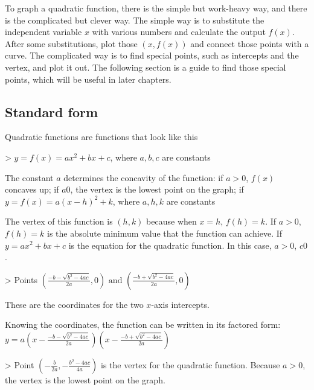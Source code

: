 To graph a quadratic function, there is the simple but work-heavy way, and there is the
complicated but clever way. The simple way is to substitute the independent variable $x$
with various numbers and calculate the output $f(x)$. After some substitutions, plot those
$(x,f(x))$ and connect those points with a curve. The complicated way is to find special
points, such as intercepts and the vertex, and plot it out. The following section is a
guide to find those special points, which will be useful in later chapters.




\subsection{Standard form}
\label{sss:stan-990f}




Quadratic functions are functions that look like this



> $y=f(x)=ax^2+bx+c$, where $a,b,c$ are constants



The constant $a$ determines the concavity of the function: if $a>0$, $f(x)$ concaves up;
if $a0$, the vertex is the lowest point on the graph; if $y=f(x)=a(x-h)^2+k$, where
$a,h,k$ are constants



The vertex of this function is $(h,k)$ because when $x=h$, $f(h)=k$. If $a>0$, $f(h)=k$ is
the absolute minimum value that the function can achieve. If $y=ax^2+bx+c$ is the
equation for the quadratic function. In this case, $a>0$, $c0$.



> Points $(\frac{-b-\sqrt{b^2-4ac}}{2a},0)\text{ and }(\frac{-b+\sqrt{b^2-4ac}}{2a},0)$



These are the coordinates for the two $x$-axis intercepts.



Knowing the coordinates, the function can be written in its factored form:
$y=a(x-\frac{-b-\sqrt{b^2-4ac}}{2a})(x-\frac{-b+\sqrt{b^2-4ac}}{2a})$



> Point $(-\frac{b}{2a},-\frac{b^2-4ac}{4a})$ is the vertex for the quadratic function.
Because $a>0$, the vertex is the lowest point on the graph.



